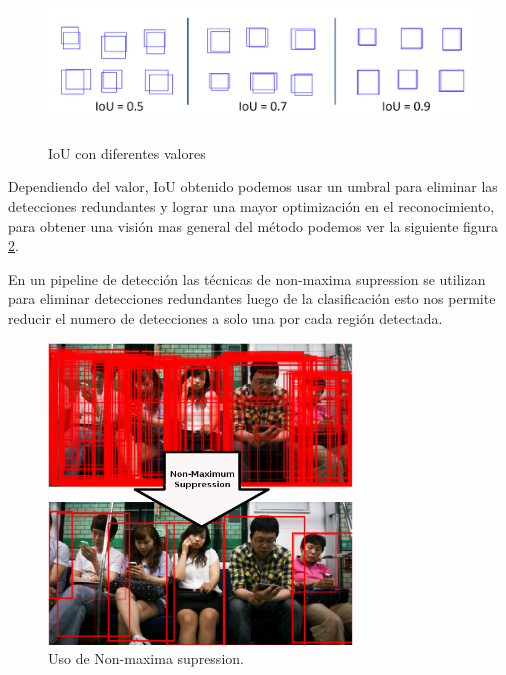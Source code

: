 \begin{figure}[H]
 \centering
  \includegraphics[height=4cm,keepaspectratio=true,clip=true]{imagenes/MarcoTeorico/overlapping.png}
  \caption{IoU con diferentes valores}\label{Fig: interseccion}
\end{figure}

Dependiendo del valor, IoU  obtenido podemos usar un umbral para  eliminar las detecciones redundantes y lograr una mayor optimización  en el reconocimiento, para obtener una visión mas general del método podemos ver la siguiente figura \ref{Fig: nonmaximumsuppression}. 

En un pipeline de detección las técnicas de non-maxima supression se utilizan para eliminar detecciones redundantes luego de la clasificación esto nos permite reducir el numero de detecciones a solo una por cada región detectada.

\begin{figure}[H]
 \centering
  \includegraphics[height=8cm,keepaspectratio=true,clip=true]{imagenes/MarcoTeorico/nms.png}
  \caption{Uso de Non-maxima supression.}\label{Fig: nonmaximumsuppression}
\end{figure}

